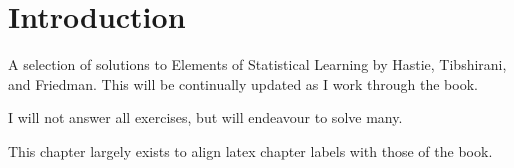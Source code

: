 \chapter{Introduction}

A selection of solutions to Elements of Statistical Learning by Hastie, Tibshirani, and Friedman.
This will be continually updated as I work through the book.

I will not answer all exercises, but will endeavour to solve many.

This chapter largely exists to align latex chapter labels with those of the book.